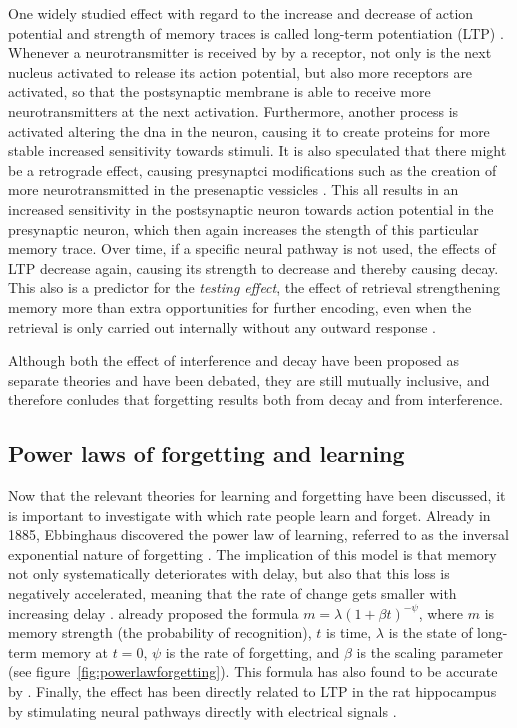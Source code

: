 One widely studied effect with regard to the increase and decrease of action potential and strength of memory traces is called long-term potentiation (LTP) \cite{cognitivepsychology, longtermpotentiation, activationbasedmodel, amnesia}. Whenever a neurotransmitter is received by by a receptor, not only is the next nucleus activated to release its action potential, but also more receptors are activated, so that the postsynaptic membrane is able to receive more neurotransmitters at the next activation. Furthermore, another process is activated altering the dna in the neuron, causing it to create proteins for more stable increased sensitivity towards stimuli. It is also speculated that there might be a retrograde effect, causing presynaptci modifications such as the creation of more neurotransmitted in the presenaptic vessicles \cite{longtermpotentiation}. This all results in an increased sensitivity in the postsynaptic neuron towards action potential in the presynaptic neuron, which then again increases the stength of this particular memory trace. Over time, if a specific neural pathway is not used, the effects of LTP decrease again, causing its strength to decrease and thereby causing decay. This also is a predictor for the \emph{testing effect}, the effect of retrieval strengthening memory more than extra opportunities for further encoding, even when the retrieval is only carried out internally without any outward response \cite{microlearning}.

Although both the effect of interference and decay have been proposed as separate theories and have been debated, they are still mutually inclusive, and  therefore conludes that forgetting results both from decay and from interference.

\subsection{Power laws of forgetting and learning}

Now that the relevant theories for learning and forgetting have been discussed, it is important to investigate with which rate people learn and forget. Already in 1885, Ebbinghaus discovered the power law of learning, referred to as the inversal exponential nature of forgetting \cite{microlearning, activationbasedmodel}. The implication of this model is that memory not only systematically deteriorates with delay, but also that this loss is negatively accelerated, meaning that the rate of change gets smaller with increasing delay \cite{cognitivepsychology}.  already proposed the formula $m = \lambda (1 + \beta t)^{-\psi}$, where $m$ is memory strength (the probability of recognition), $t$ is time, $\lambda$ is the state of long-term memory at $t = 0$, $\psi$ is the rate of forgetting, and $\beta$ is the scaling parameter (see figure~\ref{fig:powerlawforgetting}). This formula has also found to be accurate by . Finally, the effect has been directly related to LTP in the rat hippocampus by stimulating neural pathways directly with electrical signals \cite{raymond}.

